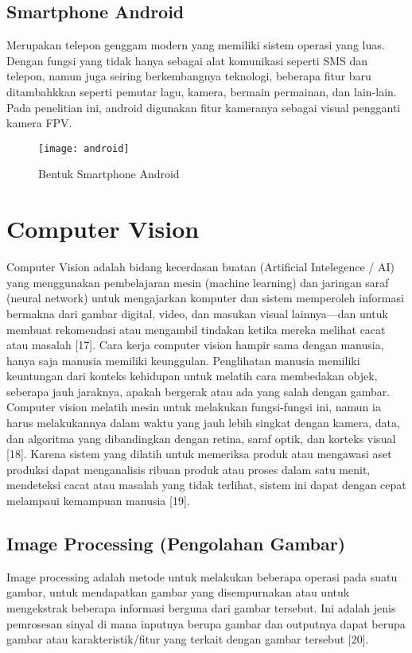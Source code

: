 \subsection{Smartphone Android}
Merupakan telepon genggam modern yang memiliki sistem operasi yang luas. Dengan fungsi yang tidak hanya sebagai alat komunikasi seperti SMS dan telepon, namun juga seiring berkembangnya teknologi, beberapa fitur baru ditambahkkan seperti pemutar lagu, kamera, bermain permainan, dan lain-lain. Pada penelitian ini, android digunakan fitur kameranya sebagai visual pengganti kamera FPV.

\begin{figure}[H]
	\centering
	\texttt{[image: android]}
	\caption{Bentuk Smartphone Android}
	\label{fig:android}
\end{figure}

\section{Computer Vision}
Computer Vision adalah bidang kecerdasan buatan (Artificial Intelegence / AI) yang menggunakan pembelajaran mesin (machine learning) dan jaringan saraf (neural network) untuk mengajarkan komputer dan sistem memperoleh informasi bermakna dari gambar digital, video, dan masukan visual lainnya—dan untuk membuat rekomendasi atau mengambil tindakan ketika mereka melihat cacat atau masalah [17].
Cara kerja computer vision hampir sama dengan manusia, hanya saja manusia memiliki keunggulan. Penglihatan manusia memiliki keuntungan dari konteks kehidupan untuk melatih cara membedakan objek, seberapa jauh jaraknya, apakah bergerak atau ada yang salah dengan gambar. Computer vision melatih mesin untuk melakukan fungsi-fungsi ini, namun ia harus melakukannya dalam waktu yang jauh lebih singkat dengan kamera, data, dan algoritma yang dibandingkan dengan retina, saraf optik, dan korteks visual [18]. 
Karena sistem yang dilatih untuk memeriksa produk atau mengawasi aset produksi dapat menganalisis ribuan produk atau proses dalam satu menit, mendeteksi cacat atau masalah yang tidak terlihat, sistem ini dapat dengan cepat melampaui kemampuan manusia [19].


\subsection{Image Processing (Pengolahan Gambar)}
Image processing adalah metode untuk melakukan beberapa operasi pada suatu gambar, untuk mendapatkan gambar yang disempurnakan atau untuk mengekstrak beberapa informasi berguna dari gambar tersebut. Ini adalah jenis pemrosesan sinyal di mana inputnya berupa gambar dan outputnya dapat berupa gambar atau karakteristik/fitur yang terkait dengan gambar tersebut [20].

